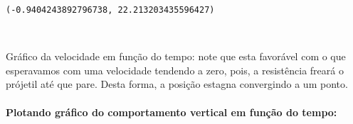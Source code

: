 \documentclass[12pt]{article}
\makeatletter
\newcommand{\boxspacing}{\kern\kvtcb@left@rule\kern\kvtcb@boxsep}
\newcommand{\prompt}[4]{
        {\ttfamily\llap{{\color{#2}[#3]:\hspace{3pt}#4}}\vspace{-\baselineskip}}
    }
\makeatother
\begin{document}
            \begin{tcolorbox}[breakable, size=fbox, boxrule=.5pt, pad at break*=1mm, opacityfill=0]
\prompt{Out}{outcolor}{6}{\boxspacing}
\begin{Verbatim}[commandchars=\\\{\}]
(-0.9404243892796738, 22.213203435596427)
\end{Verbatim}
\end{tcolorbox}
        
    \begin{center}
    \end{center}
    { \hspace*{\fill} \\}
    
    Gráfico da velocidade em função do tempo: note que esta favorável com o
que esperavamos com uma velocidade tendendo a zero, pois, a resistência
freará o prójetil até que pare. Desta forma, a posição estagna
convergindo a um ponto.

\hypertarget{plotando-gruxe1fico-do-comportamento-vertical-em-funuxe7uxe3o-do-tempo}{%
\paragraph{Plotando gráfico do comportamento vertical em função do
tempo:}\label{plotando-gruxe1fico-do-comportamento-vertical-em-funuxe7uxe3o-do-tempo}}
\end{document}
